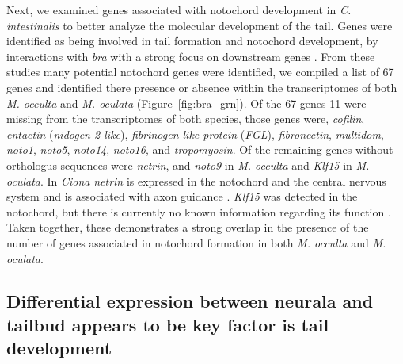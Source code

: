 Next, we examined genes associated with notochord development in \textit{C. intestinalis} to better analyze the molecular development of the tail. Genes were identified as being involved in tail formation and notochord development, by interactions with \textit{bra} with a strong focus on downstream genes \cite{hotta_temporal_1999,hotta_characterization_2000,hotta_brachyury-downstream_2007,kugler_evolutionary_2008,kugler_evolutionary_2011}. From these studies many potential notochord genes were identified, we compiled a list of 67 genes and identified there presence or absence within the %
transcriptomes of both \textit{M. occulta} and \textit{M. oculata} (Figure~\ref{fig:bra_grn}). Of the 67 genes 11 were missing from the transcriptomes of both species, those genes were, \textit{cofilin}, \textit{entactin} (\textit{nidogen-2-like}), \textit{fibrinogen-like protein} (\textit{FGL}), \textit{fibronectin}, \textit{multidom}, \textit{noto1}, \textit{noto5}, \textit{noto14}, \textit{noto16}, and \textit{tropomyosin}. Of the remaining genes without orthologus sequences were \textit{netrin}, and \textit{noto9} in \textit{M. occulta} and \textit{Klf15} in \textit{M. oculata}. In \textit{Ciona} \textit{netrin} is expressed in the notochord and the central nervous system and is associated with axon guidance \cite{hotta_characterization_2000}. \textit{Klf15} was detected in the notochord, but there is currently no known information regarding its function \cite{passamaneck_direct_2009}. Taken together, these demonstrates a strong overlap in the presence of the number of genes associated in notochord formation in both \textit{M. occulta} and \textit{M. oculata}.

\subsection{Differential expression between neurala and tailbud appears to be key factor is tail development} 

